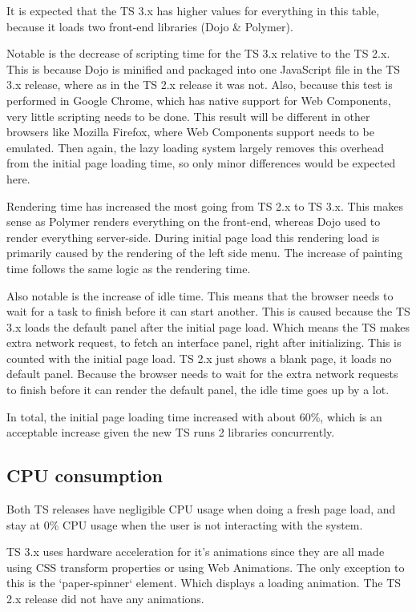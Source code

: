 \documentclass[journal]{IEEEtran}
\begin{document}
It is expected that the TS 3.x has higher values for everything in this table,
because it loads two front-end libraries (Dojo \& Polymer).

Notable is the decrease of scripting time for the TS 3.x relative to the
TS 2.x. This is because Dojo is minified and packaged into one JavaScript file
in the TS 3.x release, where as in the TS 2.x release it was not.
Also, because this test is performed in Google Chrome, which has native support
for Web Components, very little scripting needs to be done.
This result will be different in other browsers like Mozilla Firefox, where
Web Components support needs to be emulated. Then again, the lazy loading system
largely removes this overhead from the initial page loading time, so only minor
differences would be expected here.

Rendering time has increased the most going from TS 2.x to TS 3.x. This makes
sense as Polymer renders everything on the front-end, whereas Dojo used to render
everything server-side.
During initial page load this rendering load is primarily caused by the rendering
of the left side menu.
The increase of painting time follows the same logic as the rendering time.

Also notable is the increase of idle time. This means that the browser needs to
wait for a task to finish before it can start another.
This is caused because the TS 3.x loads the default panel after the initial page
load. Which means the TS makes extra network request, to fetch an interface panel,
right after initializing. This is counted with the initial page load.
TS 2.x just shows a blank page, it loads no default panel.
Because the browser needs to wait for the extra network requests to finish before
it can render the default panel, the idle time goes up by a lot.

In total, the initial page loading time increased with about 60\%, which is an
acceptable increase given the new TS runs 2 libraries concurrently.

\subsection{CPU consumption}
Both TS releases have negligible CPU usage when doing a fresh page load, and
stay at 0\% CPU usage when the user is not interacting with the system.

TS 3.x uses hardware acceleration for it's animations since they are all made
using CSS transform properties or using Web Animations\cite{webanimations}.
The only exception to this is the `paper-spinner` element. Which displays a
loading animation.
The TS 2.x release did not have any animations.
\end{document}
